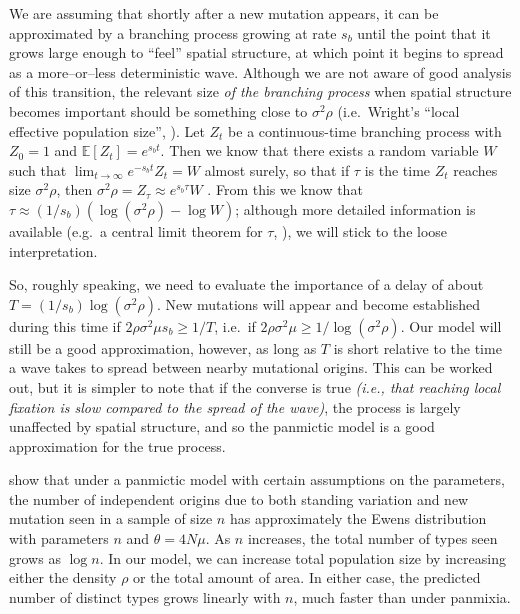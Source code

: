 \documentclass{article}
\newcommand{\gc}[1]{{\it\color{blue}#1}}
\newcommand{\mfp}[1]{{\it\color{red}#1}}
\newcommand{\E}{\mathbb{E}}
\begin{document}
We are assuming that shortly after a new mutation appears, 
it can be approximated by a branching process growing at rate \gc{$s_b$}
until the point that it grows large enough to ``feel'' spatial structure,
at which point it begins to spread as a more--or--less deterministic wave.
Although we are not aware of good analysis of this transition, 
the relevant size \gc{of the branching process} when spatial structure becomes important
should be something close to $\sigma^2 \rho$ 
(i.e.\ Wright's ``local effective population size'', \citet{Wright:43}).
Let $Z_t$ be a continuous-time branching process with $Z_0=1$ and $\E[Z_t] = e^{s_b t}$.
Then we know that there exists a random variable $W$ such that $\lim_{t\to\infty} e^{-s_b t} Z_t = W$ almost surely,
so that if $\tau$ is the time $Z_t$ reaches size $\sigma^2 \rho$, %
then $\sigma^2 \rho = Z_\tau \approx e^{s_b \tau} W$ \citep{jagers1975branching}.
From this we know that $\tau \approx (1/s_b) (\log (\sigma^2 \rho) - \log W)$;
although more detailed information is available (e.g.\ a central limit theorem for $\tau$, \citet{nagaev1971limit}),
we will stick to the loose interpretation.

So, roughly speaking, we need to evaluate the importance of a delay of about $T = (1/s_b) \log (\sigma^2 \rho)$.
New mutations will appear and become established during this time if
$2 \rho \sigma^2 \mu s_b \ge 1/T$,
i.e.\ if $2 \rho \sigma^2 \mu \ge 1/\log (\sigma^2 \rho)$.
Our model will still be a good approximation, however, 
as long as $T$ is short relative to the time a wave takes to spread between nearby mutational origins.
This can be worked out,
but it is simpler to note that if the converse is true 
\mfp{(i.e., that reaching local fixation is slow compared to the spread of the wave)}, 
the process is largely unaffected by spatial structure,
and so the panmictic model is a good approximation for the true process.


\citet{softsweepsII} show that under a panmictic model with certain assumptions on the parameters,
the number of independent origins due to both standing variation and new mutation seen in a sample of size $n$
has approximately the Ewens distribution with parameters $n$ and $\theta = 4 N \mu$.
As $n$ increases, the total number of types seen grows as $\log n$.
In our model, we can increase total population size by increasing either the density $\rho$ or the total amount of area.
In either case, the predicted number of distinct types grows linearly with $n$,
much faster than under panmixia.
\end{document}
